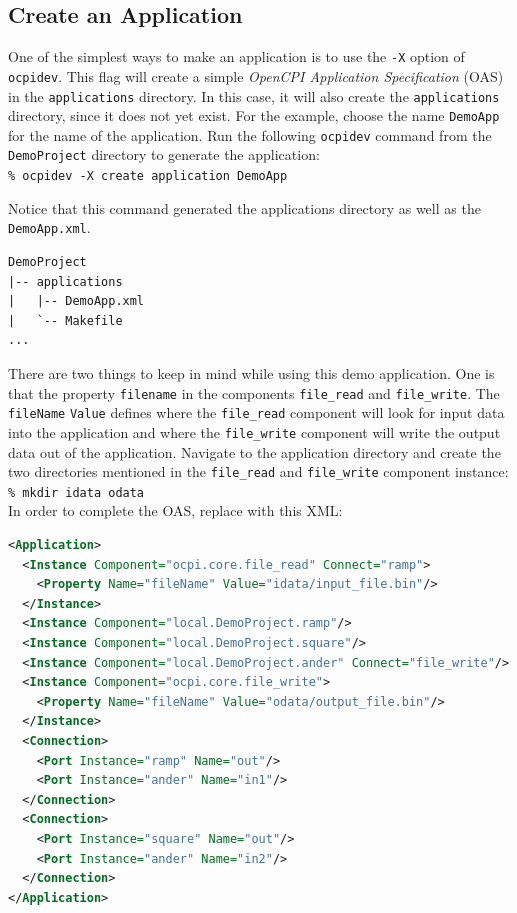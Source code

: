 \subsection{Create an Application}
One of the simplest ways to make an application is to use the \verb+-X+ option of \verb+ocpidev+. This flag will create a simple \textit{OpenCPI Application Specification} (OAS) in the \verb+applications+ directory. In this case, it will also create the \verb+applications+ directory, since it does not yet exist. For the example, choose the name \verb+DemoApp+ for the name of the application. Run the following \verb+ocpidev+ command from the \verb+DemoProject+ directory to generate the application:\\

\forceindent\verb+% ocpidev -X create application DemoApp+\\
\OcpidevCreate{}

Notice that this command generated the applications directory as well as the \verb+DemoApp.xml+.

\begin{verbatim}
DemoProject
|-- applications
|   |-- DemoApp.xml
|   `-- Makefile
...
\end{verbatim}

There are two things to keep in mind while using this demo application. One is that the property \verb+filename+ in the components \verb+file_read+ and \verb+file_write+. The \verb+fileName+ \verb+Value+ defines where the \verb+file_read+ component will look for input data into the application and where the \verb+file_write+ component will write the output data out of the application. \newline
\bstart
Navigate to the application directory and create the two directories mentioned in the \verb+file_read+ and \verb+file_write+ component instance:\\

\forceindent\verb+% mkdir idata odata+\\
\bend
\bstart
In order to complete the OAS, replace  with this XML:
\begin{lstlisting}[language=xml]
<Application>
  <Instance Component="ocpi.core.file_read" Connect="ramp">
    <Property Name="fileName" Value="idata/input_file.bin"/>
  </Instance>
  <Instance Component="local.DemoProject.ramp"/>
  <Instance Component="local.DemoProject.square"/>
  <Instance Component="local.DemoProject.ander" Connect="file_write"/>
  <Instance Component="ocpi.core.file_write">
    <Property Name="fileName" Value="odata/output_file.bin"/>
  </Instance>
  <Connection>
    <Port Instance="ramp" Name="out"/>
    <Port Instance="ander" Name="in1"/>
  </Connection>
  <Connection>
    <Port Instance="square" Name="out"/>
    <Port Instance="ander" Name="in2"/>
  </Connection>
</Application>
\end{lstlisting}
\bend

